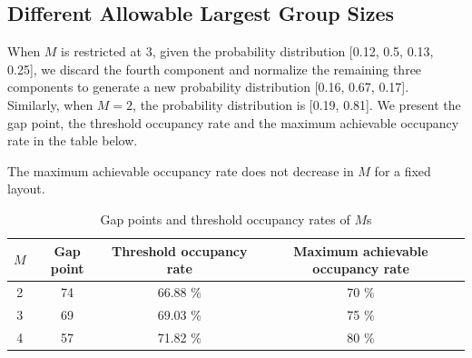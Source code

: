 \subsection*{Different Allowable Largest Group Sizes}
When $M$ is restricted at 3, given the probability distribution [0.12, 0.5, 0.13, 0.25], we discard the fourth component and normalize the remaining three components to generate a new probability distribution [0.16, 0.67, 0.17]. Similarly, when $M =2$, the probability distribution is [0.19, 0.81].
We present the gap point, the threshold occupancy rate and the maximum achievable occupancy rate in the table below.

\begin{corollary}\label{maximum_or}
  The maximum achievable occupancy rate does not decrease in $M$ for a fixed layout.
\end{corollary}


\begin{table}[ht]
  \centering
  \caption{Gap points and threshold occupancy rates of $M$s}
  \begin{tabular}{c|ccc}
  \hline
   $M$  & Gap point & Threshold occupancy rate & Maximum achievable occupancy rate \\
  \hline
   2 &  74  & 66.88 \% & 70 \% \\
   3 &  69  & 69.03 \% & 75 \% \\
   4 &  57  & 71.82 \% & 80 \% \\ 
   \hline
  \end{tabular}
\end{table}



